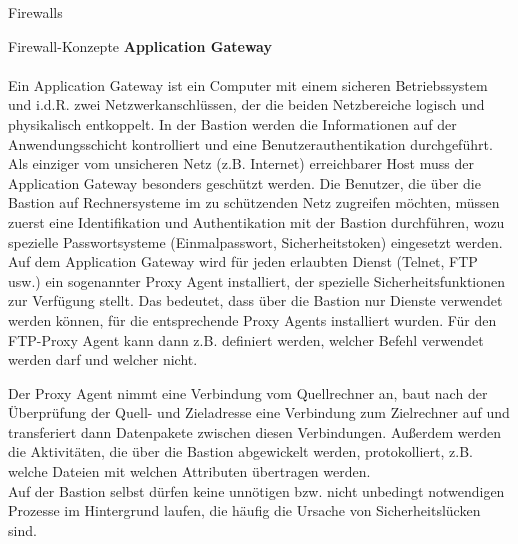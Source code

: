 \begin{section}{Firewalls}
\begin{subsection}{Firewall-Konzepte}
	\textbf{Application Gateway}  \cite{Firewall1} \\ \\
	Ein Application Gateway ist ein Computer mit einem sicheren Betriebssystem 
	und i.d.R. zwei Netzwerkanschlüssen, der die beiden Netzbereiche 
	logisch und physikalisch entkoppelt. In der Bastion werden die Informationen 
	auf der Anwendungsschicht kontrolliert und eine Benutzerauthentikation durchgeführt.
	\\
	Als einziger vom unsicheren Netz (z.B. Internet) erreichbarer Host muss der 
	Application Gateway besonders geschützt werden. Die Benutzer, 
	die über die Bastion auf Rechnersysteme im zu schützenden Netz zugreifen möchten, 
	müssen zuerst eine Identifikation und Authentikation mit der Bastion durchführen, 
	wozu spezielle Passwortsysteme (Einmalpasswort, Sicherheitstoken) eingesetzt werden.
	\\
	Auf dem Application Gateway wird für jeden erlaubten Dienst (Telnet, FTP usw.) 
	ein sogenannter Proxy Agent installiert, der spezielle Sicherheitsfunktionen zur Verfügung stellt.
	Das bedeutet, dass über die Bastion nur Dienste verwendet werden können, 
	für die entsprechende Proxy Agents installiert wurden. 
	Für den FTP-Proxy Agent kann dann z.B. definiert werden, 
	welcher Befehl verwendet werden darf und welcher nicht.

	Der Proxy Agent nimmt eine Verbindung vom Quellrechner an, 
	baut nach der Überprüfung der Quell- und Zieladresse eine Verbindung 
	zum Zielrechner auf und transferiert dann Datenpakete zwischen diesen Verbindungen. 
	Außerdem werden die Aktivitäten, die über die Bastion abgewickelt werden, protokolliert, 
	z.B. welche Dateien mit welchen Attributen übertragen werden.
	\\
	Auf der Bastion selbst dürfen keine unnötigen bzw. nicht unbedingt notwendigen
	Prozesse im Hintergrund laufen, die häufig die Ursache von Sicherheitslücken sind. \\
	

\end{subsection}
\end{section}
